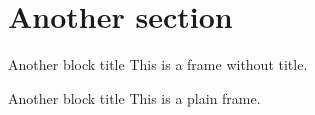 %
%
%

\section{Another section}

\begin{frame}
  \begin{block}{Another block title}
    This is a frame without title.
  \end{block}
\end{frame}

\begin{frame}[plain]
  \begin{block}{Another block title}
    This is a plain frame.
  \end{block}
\end{frame}
